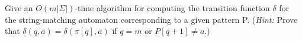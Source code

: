 Give an $O(m|\Sigma|)$-time algorithm for computing the transition function $\delta$ for 
the string-matching automaton corresponding to a given pattern P. (\textit{Hint:} Prove that 
$\delta(q,a) = \delta(\pi[q],a)$ if $q = m$ or $P[q+1]\neq a$.)